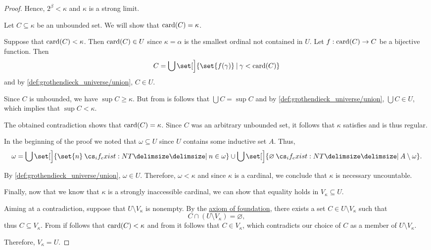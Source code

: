 \begin{proof}
  Hence, \( 2^\beta < \kappa \) and \( \kappa \) is a strong limit.

   Let \( C \subseteq \kappa \) be an unbounded set. We will show that \( \operatorname{card}(C) = \kappa \).

  Suppose that \( \operatorname{card}(C) < \kappa \). Then \( \operatorname{card}(C) \in U \) since \( \kappa = \alpha \) is the smallest ordinal not contained in \( U \). Let \( f: \operatorname{card}(C) \to C \) be a bijective function. Then
  \begin{equation*}
    C = \bigcup\set[\Big]{ \set{ f(\gamma) } \given \gamma < \card(C) }
  \end{equation*}
  and by \ref{def:grothendieck_universe/union}, \( C \in U \).

  Since \( C \) is unbounded, we have \( \sup C \geq \kappa \). But from  is follows that \( \bigcup C = \sup C \) and by \ref{def:grothendieck_universe/union}, \( \bigcup C \in U \), which implies that \( \sup C < \kappa \).

  The obtained contradiction shows that \( \operatorname{card}(C) = \kappa \). Since \( C \) was an arbitrary unbounded set, it follows that \( \kappa \) satisfies  and is thus regular.

   In the beginning of the proof we noted that \( \omega \subseteq U \) since \( U \) contains some inductive set \( A \). Thus,
  \begin{equation*}
    \omega = \bigcup\set[\Big]{ \set{ n } \given* n \in \omega } \cup \bigcup\set[\Big]{ \varnothing \given* A \setminus \omega }.
  \end{equation*}

  By \ref{def:grothendieck_universe/union}, \( \omega \in U \). Therefore, \( \omega < \kappa \) and since \( \kappa \) is a cardinal, we conclude that \( \kappa \) is necessary uncountable.

   Finally, now that we know that \( \kappa \) is a strongly inaccessible cardinal, we can show that equality holds in \( V_\kappa \subseteq U \).

  Aiming at a contradiction, suppose that \( U \setminus V_\kappa \) is nonempty. By the \hyperref[def:zfc/foundation]{axiom of foundation}, there exists a set \( C \in U \setminus V_\kappa \) such that
  \begin{equation*}
    C \cap (U \setminus V_\kappa) = \varnothing,
  \end{equation*}
  thus \( C \subseteq V_\kappa \). From  if follows that \( \operatorname{card}(C) < \kappa \) and from  it follows that \( C \in V_\kappa \), which contradicts our choice of \( C \) as a member of \( U \setminus V_\kappa \).

  Therefore, \( V_\kappa = U \).
\end{proof}

